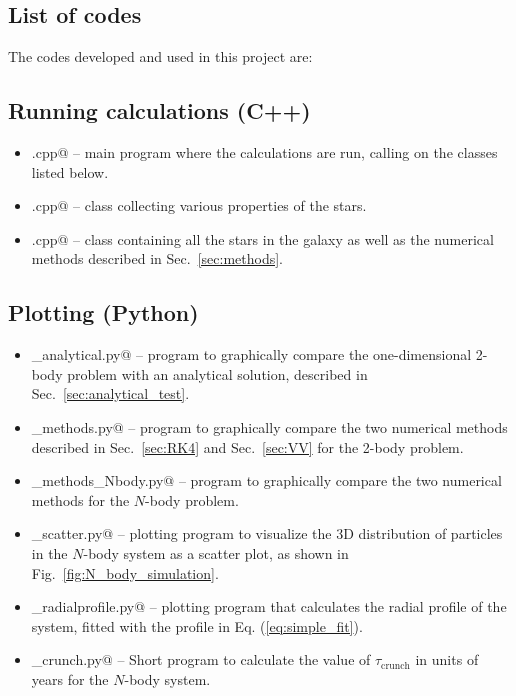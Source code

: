 \documentclass{article}
\begin{document}
\begin{multicols}{2}
\section{List of codes}

The codes developed and used in this project are: 


\subsection{Running calculations (C++)}

\begin{itemize}
	\item \verb@main.cpp@ -- main program where the calculations are run, calling on the classes listed below. 
	\item \verb@star.cpp@ -- class collecting various properties of the stars.
	\item \verb@galaxy.cpp@ -- class containing all the stars in the galaxy as well as the numerical methods described in Sec.~\ref{sec:methods}.
\end{itemize}


\subsection{Plotting (Python)}

\begin{itemize}
	\item \verb@plotting_analytical.py@ -- program to graphically compare the one-dimensional 2-body problem with an analytical solution, described in Sec.~\ref{sec:analytical_test}.
	\item \verb@plot_methods.py@ -- program to graphically compare the two numerical methods described in Sec.~\ref{sec:RK4} and Sec.~\ref{sec:VV} for the 2-body problem.
	\item \verb@plot_methods_Nbody.py@ -- program to graphically compare the two numerical methods for the $N$-body problem.
	\item \verb@plotting_scatter.py@ -- plotting program to visualize the 3D distribution of particles in the $N$-body system as a scatter plot, as shown in Fig.~\ref{fig:N_body_simulation}. 
	\item \verb@plotting_radialprofile.py@ -- plotting program that calculates the radial profile of the system, fitted with the profile in Eq. (\ref{eq:simple_fit}). %
	\item \verb@t_crunch.py@ -- Short program to calculate the value of $\tau_{\mathrm{crunch}}$ in units of years for the $N$-body system.
\end{itemize}




\end{multicols}
\end{document}

